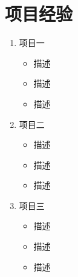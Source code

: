 \section*{项目经验}

\begin{enumerate}
    \item 项目一
    \begin{itemize}
        \item 描述
        \item 描述
        \item 描述
    \end{itemize}
    \item 项目二
    \begin{itemize}
        \item 描述
        \item 描述
        \item 描述
    \end{itemize}
    \item 项目三
    \begin{itemize}
        \item 描述
        \item 描述
        \item 描述
    \end{itemize}
\end{enumerate}